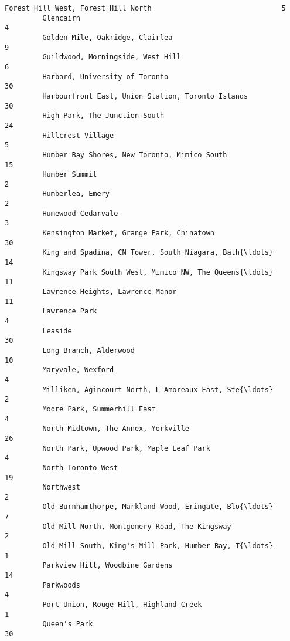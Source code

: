 \documentclass[11pt]{article}
\begin{document}
\begin{Verbatim}[commandchars=\\\{\}]
         Forest Hill West, Forest Hill North                               5   
         Glencairn                                                         4   
         Golden Mile, Oakridge, Clairlea                                   9   
         Guildwood, Morningside, West Hill                                 6   
         Harbord, University of Toronto                                   30   
         Harbourfront East, Union Station, Toronto Islands                30   
         High Park, The Junction South                                    24   
         Hillcrest Village                                                 5   
         Humber Bay Shores, New Toronto, Mimico South                     15   
         Humber Summit                                                     2   
         Humberlea, Emery                                                  2   
         Humewood-Cedarvale                                                3   
         Kensington Market, Grange Park, Chinatown                        30   
         King and Spadina, CN Tower, South Niagara, Bath{\ldots}               14   
         Kingsway Park South West, Mimico NW, The Queens{\ldots}               11   
         Lawrence Heights, Lawrence Manor                                 11   
         Lawrence Park                                                     4   
         Leaside                                                          30   
         Long Branch, Alderwood                                           10   
         Maryvale, Wexford                                                 4   
         Milliken, Agincourt North, L'Amoreaux East, Ste{\ldots}                2   
         Moore Park, Summerhill East                                       4   
         North Midtown, The Annex, Yorkville                              26   
         North Park, Upwood Park, Maple Leaf Park                          4   
         North Toronto West                                               19   
         Northwest                                                         2   
         Old Burnhamthorpe, Markland Wood, Eringate, Blo{\ldots}                7   
         Old Mill North, Montgomery Road, The Kingsway                     2   
         Old Mill South, King's Mill Park, Humber Bay, T{\ldots}                1   
         Parkview Hill, Woodbine Gardens                                  14   
         Parkwoods                                                         4   
         Port Union, Rouge Hill, Highland Creek                            1   
         Queen's Park                                                     30   

\end{Verbatim}
\end{document}
